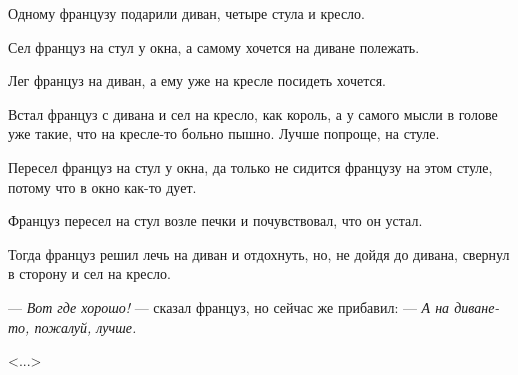 Одному французу подарили диван, четыре стула и кресло.

Сел француз на стул у окна, а самому хочется на диване полежать.

Лег француз на диван, а ему уже на кресле посидеть хочется.

Встал француз с дивана и сел на кресло, как король, а у самого мысли в голове уже такие, что на кресле-то больно пышно. Лучше попроще, на стуле.

Пересел француз на стул у окна, да только не сидится французу на этом стуле, потому что в окно как-то дует.

Француз пересел на стул возле печки и почувствовал, что он устал.

Тогда француз решил лечь на диван и отдохнуть, но, не дойдя до дивана, свернул в сторону и сел на кресло.

--- \textit{Вот где хорошо!} --- сказал француз, но сейчас же прибавил: --- \textit{А на диване-то, пожалуй, лучше.}

\hfill <...>